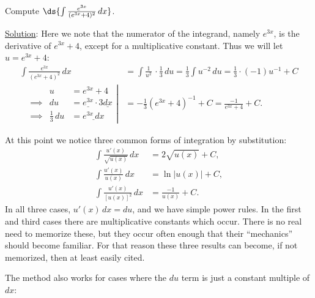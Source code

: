 \bex Compute $\ds{\int\frac{e^{3x}}{(e^{3x}+4)^2}\,dx}$.

\underline{Solution}:
Here we note that the numerator of the integrand, namely $e^{3x}$, is
the derivative of $e^{3x}+4$, except for a multiplicative constant.
Thus we will let $u=e^{3x}+4$:
\begin{align*}
\int\frac{e^{3x}}{(e^{3x}+4)^2}\,dx&
  =\int\frac1{u^2}\,\cdot\frac13\,du
  =\frac13\int u^{-2}\,du =\frac13\cdot(-1)u^{-1}+C\\
\left.\begin{alignedat}{2}
&&u&=e^{3x}+4\\
&\implies&du&=\underline{e^{3x}}\cdot3\underline{dx}\\
&\implies&\frac13\,du&=\underline{e^{3x}\,dx}
\end{alignedat}\right|&=-\frac13(e^{3x}+4)^{-1}+C 
                        =\frac{-1}{e^{3x}+4}+C.
\end{align*}


\eex

At this point we notice three common forms of integration by
substitution:
\begin{align}
\int\frac{u'(x)}{\sqrt{u(x)}}\,dx&=2\sqrt{u(x)}+C,\\
\int\frac{u'(x)}{u(x)}\,dx&=\ln|u(x)|+C,\\
\int\frac{u'(x)}{[u(x)]^2}\,dx&=\frac{-1}{u(x)}+C.
\end{align}
In all three cases, $u'(x)\,dx=du$, and we have simple power
rules.  In the first and third cases there are
multiplicative constants which occur.  There is no real
need to memorize these, but they occur often enough that 
their ``mechanics'' should become familiar.  For that
reason these three results can become, if not memorized, 
then at least easily cited.

The method also works for cases where the $du$ term is 
just a constant multiple of $dx$:
%
%

